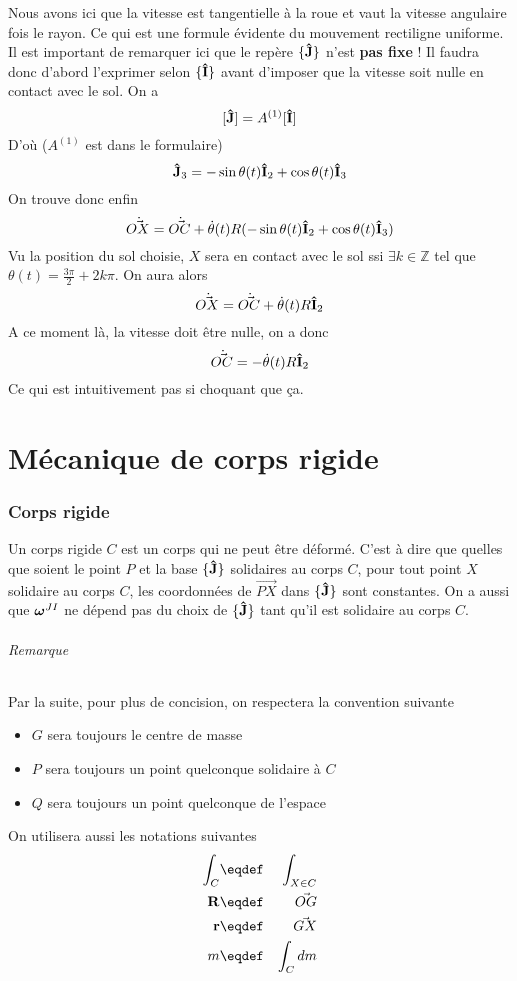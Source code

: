 Nous avons ici que la vitesse est tangentielle à la roue et vaut la vitesse angulaire fois le rayon.
Ce qui est une formule évidente du mouvement rectiligne uniforme.
Il est important de remarquer ici que le repère $\{{\bf\hat{J}}\}$ n'est {\bf pas fixe} !
Il faudra donc d'abord l'exprimer selon $\{{\bf\hat{I}}\}$ avant d'imposer que la vitesse soit nulle en contact avec le sol.
On a
\[ [{\bf\hat{J}}] = A^{(1)} [{\bf\hat{I}}] \]
D'où ($A^{(1)}$ est dans le formulaire)
\[ {\bf\hat{J}}_3 = -\sin\theta(t) {\bf\hat{I}}_2 + \cos\theta(t) {\bf\hat{I}}_3 \]
On trouve donc enfin
\[ \dot{\vec{ OX}} = \dot{\vec{ OC}} + \dot{\theta}(t) R (-\sin\theta(t) {\bf\hat{I}}_2 + \cos\theta(t) {\bf\hat{I}}_3) \]
Vu la position du sol choisie, $X$ sera en contact avec le sol ssi $\exists k \in \mathbb{Z}$ tel que $\theta(t) = \frac{3\pi}{2} + 2k\pi$.
On aura alors
\[ \dot{\vec{ OX}} = \dot{\vec{ OC}} + \dot{\theta}(t) R {\bf\hat{I}}_2 \]
A ce moment là, la vitesse doit être nulle, on a donc
\[ \dot{\vec{ OC}} = -\dot{\theta}(t) R {\bf\hat{I}}_2 \]
Ce qui est intuitivement pas si choquant que ça.


\part{Mécanique de corps rigide}
\section{Corps rigide}
Un corps rigide $C$ est un corps qui ne peut être déformé.
C'est à dire que quelles que soient le point $P$ et la base $\{{\bf\hat{J}}\}$ solidaires au corps $C$, pour tout point $X$ solidaire au corps $C$, les coordonnées de $\vec{PX}$ dans $\{{\bf\hat{J}}\}$ sont constantes.
On a aussi que ${\bm \omega}^{JI}$ ne dépend pas du choix de $\{{\bf\hat{J}}\}$ tant qu'il est solidaire au corps $C$.

\paragraph{Remarque}
Par la suite, pour plus de concision, on respectera la convention suivante
\begin{itemize}
	\item $G$ sera toujours le centre de masse
	\item $P$ sera toujours un point quelconque solidaire à $C$
	\item $Q$ sera toujours un point quelconque de l'espace
\end{itemize}

On utilisera aussi les notations suivantes
\begin{eqnarray*}
	\int_C &\eqdef& \int_{X \in C}\\
	\xg &\eqdef& \vec{OG}\\
	\fv{r} &\eqdef& \vec{GX}\\
	m &\eqdef& \int_C dm
\end{eqnarray*}

